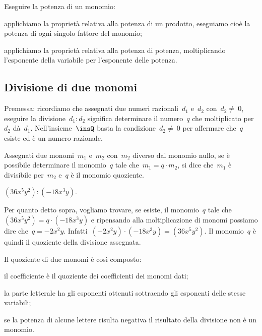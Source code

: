 \begin{procedura}
Eseguire la potenza di un monomio:

\begin{enumeratea}
 \item applichiamo la proprietà relativa alla potenza di un prodotto,
eseguiamo cioè la potenza di ogni singolo fattore del monomio;
 \item applichiamo la proprietà relativa alla potenza di potenza,
moltiplicando l'esponente della variabile per l'esponente delle potenza.
\end{enumeratea}
\end{procedura}


\subsection{Divisione di due monomi}
\label{subsec:09_monomi_quoziente}

Premessa: ricordiamo che assegnati due numeri razionali~$d_{1}$
e~$d_{2}$ con~$d_{2}\neq~0$, eseguire la
divisione~$d_{1}:d_{2}$ significa determinare il numero~$q$
che moltiplicato per~$d_{2}$ dà~$d_{1}$.
Nell'insieme~$\insQ$ basta la condizione~$d_{2}\neq~0$ per
affermare che~$q$ esiste ed è un numero razionale.

\begin{definizione}
Assegnati due monomi~$m_{1}$ e~$m_{2}$ con~$m_{2}$ diverso dal monomio nullo, se
è possibile determinare il monomio~$q$ tale che~$m_{1} = q\cdot m_{2}$, si dice che~$m_{1}$ è
divisibile per~$m_{2}$ e~$q$ è il monomio quoziente.
\end{definizione}

\begin{exrig}
 \begin{esempio}
$(36x^{5}y^{2}):(-18x^{3}y)$.

Per quanto detto sopra, vogliamo trovare, se esiste, il monomio~$q$ tale
che~$(36x^{5}y^{2})=q\cdot (-18x^{3}y)$
e ripensando alla moltiplicazione di monomi possiamo dire
che~$q=-2x^{2}y$. Infatti~$(-2x^{2}y)\cdot(-18x^{3}y)=(36x^{5}y^{2})$. Il monomio~$q$
è quindi il quoziente della divisione assegnata.
 \end{esempio}
\end{exrig}

\begin{procedura}
Il quoziente di due monomi è così composto:

\begin{enumeratea}
 \item il coefficiente è il quoziente dei coefficienti dei monomi dati;
 \item la parte letterale ha gli esponenti ottenuti sottraendo gli esponenti
delle stesse variabili;
 \item se la potenza di alcune lettere risulta negativa il risultato della
divisione non è un monomio.
\end{enumeratea}
\end{procedura}

